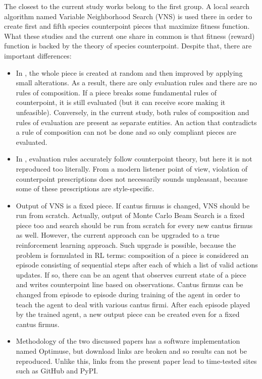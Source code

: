 \documentclass{article}
\begin{document}
The closest to the current study works \cite{herremans2012first, herremans2013fifth} belong to the first group. A local search algorithm named Variable Neighborhood Search (VNS) is used there in order to create first and fifth species counterpoint pieces that maximize fitness function. What these studies and the current one share in common is that fitness (reward) function is backed by the theory of species counterpoint. Despite that, there are important differences:
\begin{itemize}
	\item In \cite{herremans2012first, herremans2013fifth}, the whole piece is created at random and then improved by applying small alterations. As a result, there are only evaluation rules and there are no rules of composition. If a piece breaks some fundamental rules of counterpoint, it is still evaluated (but it can receive score making it unfeasible). Conversely, in the current study, both rules of composition and rules of evaluation are present as separate entities. An action that contradicts a rule of composition can not be done and so only compliant pieces are evaluated.
	\item In \cite{herremans2012first, herremans2013fifth}, evaluation rules accurately follow counterpoint theory, but here it is not reproduced too literally. From a modern listener point of view, violation of counterpoint prescriptions does not necessarily sounds unpleasant, because some of these prescriptions are style-specific.
	\item Output of VNS is a fixed piece. If cantus firmus is changed, VNS should be run from scratch. Actually, output of Monte Carlo Beam Search is a fixed piece too and search should be run from scratch for every new cantus firmus as well. However, the current approach can be upgraded to a true reinforcement learning approach. Such upgrade is possible, because the problem is formulated in RL terms: composition of a piece is considered an episode consisting of sequential steps after each of which a list of valid actions updates. If so, there can be an agent that observes current state of a piece and writes counterpoint line based on observations. Cantus firmus can be changed from episode to episode during training of the agent in order to teach the agent to deal with various cantus firmi. After each episode played by the trained agent, a new output piece can be created even for a fixed cantus firmus.
	\item Methodology of the two discussed papers has a software implementation named Optimuse, but download links are broken and so results can not be reproduced. Unlike this, links from the present paper lead to time-tested sites such as GitHub and PyPI.
\end{itemize}
\end{document}
